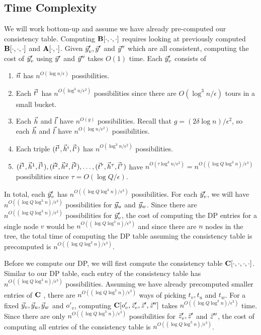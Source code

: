 \documentclass[twoside,leqno]{article}
\newcommand{\eps}{\epsilon}
\begin{document}
\subsection{Time Complexity}
We will work bottom-up and assume we have already pre-computed our consistency table. Computing $\textbf{B}[\cdot, \cdot, \cdot]$ requires looking at previously computed $\textbf{B}[\cdot, \cdot, \cdot]$ and  $\textbf{A}[\cdot,\cdot]$. Given $\vec{y}_v', \vec{y}'$ and $\vec{y}''$ which are all consistent, computing the cost of $\vec{y}_v'$ using $\vec{y}'$ and $\vec{y}''$ takes $O(1)$ time. Each $\vec{y}_v'$ consists of 
\begin{enumerate}
    \item $\vec{n}$ has $n^{O(\log n / \eps)}$ possibilities. 
    \item Each $\vec{t}^i$ has $n^{O(\log^3 n /\eps^2)}$ possibilities since there are $O(\log^3 n /\eps)$ tours in a small bucket. 
    \item Each $\vec{h}$ and $\vec{l}$ have $n^{O(g)}$ possibilities. Recall that $g = (2\delta \log n)/\eps^2 $, so each $\vec{h}$ and $\vec{l}$ have $n^{O(\log n /\eps^2)}$ possibilities. 
    \item Each triple $(\vec{t}^i, \vec{h}^i, \vec{l}^i)$ has $n^{O(\log^3 n /\eps^2)}$ possibilities. 
    \item $(\vec{t}^1, \vec{h}^1, \vec{l}^1), (\vec{t}^2, \vec{h}^2, \vec{l}^2), \ldots, (\vec{t}^\tau, \vec{h}^\tau, \vec{l}^\tau)$ have $n^{O(\tau \log^3 n /\eps^2)} = n^{O((\log Q\log^3 n)/\eps^3)}$ possibilities since $\tau = O(\log Q/\eps)$. 
\end{enumerate}
In total, each $\vec{y}_v'$ has $n^{O((\log Q\log^3 n)/\eps^3)}$ possibilities. For each $\vec{y}_v'$, we will have $n^{O((\log Q\log^3 n)/\eps^3)}$ possibilities for $\vec{y}_u$ and $\vec{y}_w$. Since there are $n^{O((\log Q\log^3 n)/\eps^3)}$ possibilities for $\vec{y}_v'$, the cost of computing the DP entries for a single node $v$ would be $n^{O((\log Q\log^3 n)/\eps^3)}$ and since there are $n$ nodes in the tree, the total time of computing the DP table assuming the consistency table is precomputed is $n^{O((\log Q\log^3 n)/\eps^3)}$. 

Before we compute our DP, we will first compute the consistency table $\textbf{C}[\cdot, \cdot, \cdot, \cdot]$. Similar to our DP table, each entry of the consistency table has $n^{O((\log Q\log^3 n)/\eps^3)}$ possibilities. Assuming we have already precomputed smaller entries of $\textbf{C}$ , there are $n^{O((\log Q\log^3 n)/\eps^3)}$ ways of picking $t_v, t_u$ and $t_w$. For a fixed $\vec{y}_v, \vec{y}_u, \vec{y}_w$ and $o'_v$, computing $\textbf{C}[o'_v, \vec{z}_v', \vec{z}', \vec{z}'']$ takes $n^{O((\log Q\log^3 n)/\eps^3)}$ time. Since there are only $n^{O((\log Q\log^3 n)/\eps^3)}$ possibilities for $\vec{z}_v', \vec{z}'$ and $\vec{z}''$, the cost of computing all entries of the consistency table is $n^{O((\log Q\log^3 n)/\eps^3)}$. 
\end{document}
